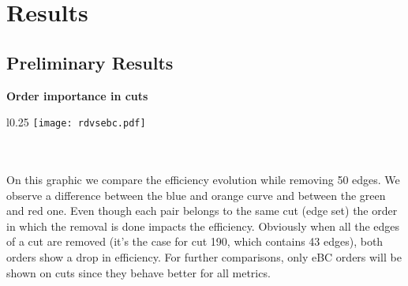 \section{Results}
\label{sec:results}

\subsection{Preliminary Results}

\textbf{Order importance in cuts}\\
\begin{wrapfigure}[12]{l}{0.25\textwidth}
    \texttt{[image: rdvsebc.pdf]}\\
\end{wrapfigure}\\
\vspace{10pt}\\
On this graphic we compare the efficiency evolution while removing 50 edges. We observe a difference between the blue and orange curve and between the green and red one. Even though each pair belongs to the same cut (edge set) the order in which the removal is done impacts the efficiency. Obviously when all the edges of a cut are removed (it's the case for cut 190, which contains 43 edges), both orders show a drop in efficiency. For further comparisons, only eBC orders will be shown on cuts since they behave better for all metrics.\\
\vspace{50pt}\\

